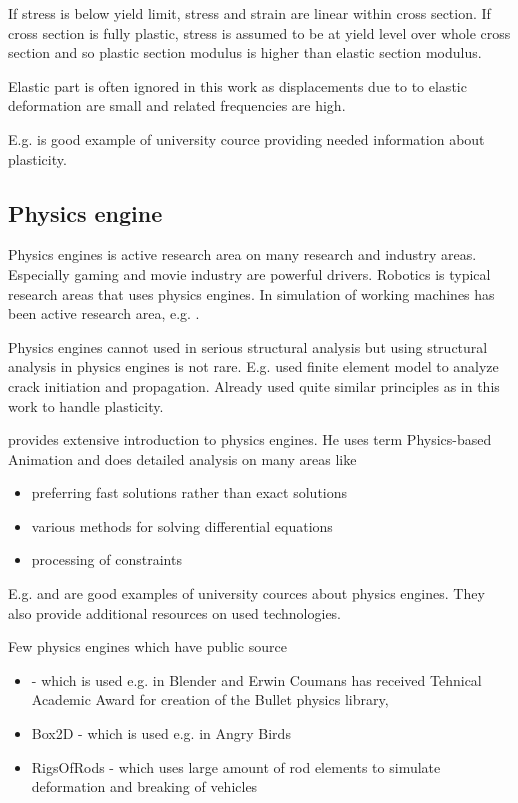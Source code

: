 If stress is below yield limit, stress and strain are linear within cross section.
If cross section is fully plastic, stress is assumed to be at yield level over whole cross section and 
so plastic section modulus is higher than elastic section modulus.

Elastic part is often ignored in this work as displacements due to to elastic deformation are small and 
related frequencies are high.

E.g. \cite{camp} is good example of university cource providing needed information about plasticity.

\subsection{Physics engine}

Physics engines is active research area on many research and industry areas.
Especially gaming and movie industry are powerful drivers.
Robotics is typical research areas that uses physics engines.
In \lut simulation of working machines has been active research area, e.g. \cite{moisio.thesis}.

Physics engines cannot used in serious structural analysis but using structural analysis in physics engines is not rare.  
E.g. \cite{Obrien:1999:GMA} used finite element model to analyze crack initiation and propagation.
Already \cite{cg1988} used quite similar principles as in this work to handle plasticity. 

\cite{erleben.thesis} provides extensive introduction to physics engines. 
He uses term Physics-based Animation and does detailed analysis on many areas like
\begin{itemize}
\item preferring fast solutions rather than exact solutions
\item various methods for solving differential equations
\item processing of constraints
\end{itemize}

E.g. \cite{cornell.cs3152} and \cite{cornell.cs5643} are good examples of  university cources
about physics engines. They also provide additional resources on used technologies.

Few physics engines which have public source

\begin{itemize}
\item \bullet - \cite{bullet} which is used e.g. in Blender and Erwin Coumans
 has received Tehnical Academic Award for creation of the Bullet physics library, \cite{erwin.oscar}
\item Box2D - \cite{box2d} which is used e.g. in Angry Birds
\item RigsOfRods - \cite{ror} which uses large amount of rod elements to simulate deformation and breaking of vehicles
\end{itemize}



